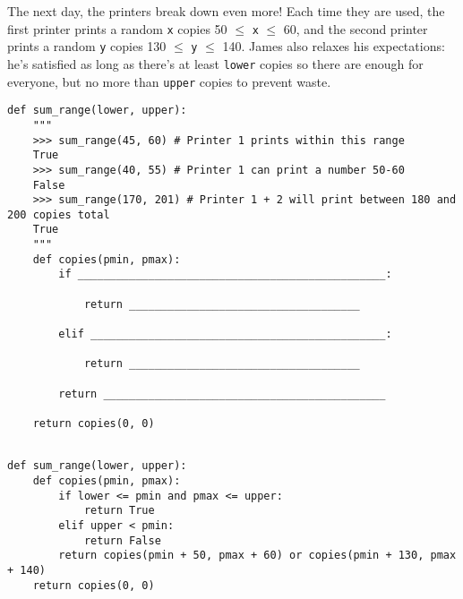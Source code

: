 \begin{blocksection}
\question The next day, the printers break down even more! Each time they are used, the first printer 
prints a random \lstinline$x$ copies 50 $\leq$ \lstinline$x$ $\leq$ 60, and the second printer prints a 
random \lstinline$y$ copies 130 $\leq$ \lstinline$y$ $\leq$ 140. James also relaxes his expectations: he's
satisfied as long as there's at least \lstinline$lower$ copies so there are enough for everyone, but no
more than \lstinline$upper$ copies to prevent waste. \\

\begin{lstlisting}
def sum_range(lower, upper):
    """
    >>> sum_range(45, 60) # Printer 1 prints within this range
    True
    >>> sum_range(40, 55) # Printer 1 can print a number 50-60
    False
    >>> sum_range(170, 201) # Printer 1 + 2 will print between 180 and 200 copies total
    True
    """
    def copies(pmin, pmax):
        if ________________________________________________:
				
            return ____________________________________
						
        elif ______________________________________________:
				
            return ____________________________________
						
        return ____________________________________________
				
    return copies(0, 0)
    
\end{lstlisting}

\begin{solution}[1.5in]
\begin{lstlisting}
def sum_range(lower, upper):
    def copies(pmin, pmax):
        if lower <= pmin and pmax <= upper:
            return True
        elif upper < pmin:
            return False
        return copies(pmin + 50, pmax + 60) or copies(pmin + 130, pmax + 140)
    return copies(0, 0)
\end{lstlisting}
\end{solution}
\end{blocksection}
